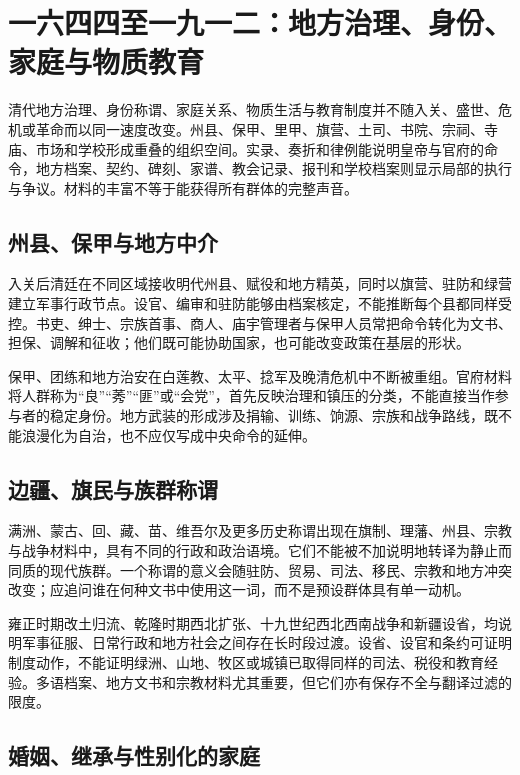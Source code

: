 \section{一六四四至一九一二：地方治理、身份、家庭与物质教育}
\label{sec:qing-local-government-identity-family-material-life}

清代地方治理、身份称谓、家庭关系、物质生活与教育制度并不随入关、盛世、危机或革命而以同一速度改变。州县、保甲、里甲、旗营、土司、书院、宗祠、寺庙、市场和学校形成重叠的组织空间。实录、奏折和律例能说明皇帝与官府的命令，地方档案、契约、碑刻、家谱、教会记录、报刊和学校档案则显示局部的执行与争议。材料的丰富不等于能获得所有群体的完整声音。

\subsection{州县、保甲与地方中介}

入关后清廷在不同区域接收明代州县、赋役和地方精英，同时以旗营、驻防和绿营建立军事行政节点。设官、编审和驻防能够由档案核定，不能推断每个县都同样受控。书吏、绅士、宗族首事、商人、庙宇管理者与保甲人员常把命令转化为文书、担保、调解和征收；他们既可能协助国家，也可能改变政策在基层的形状。

保甲、团练和地方治安在白莲教、太平、捻军及晚清危机中不断被重组。官府材料将人群称为“良”“莠”“匪”或“会党”，首先反映治理和镇压的分类，不能直接当作参与者的稳定身份。地方武装的形成涉及捐输、训练、饷源、宗族和战争路线，既不能浪漫化为自治，也不应仅写成中央命令的延伸。

\subsection{边疆、旗民与族群称谓}

满洲、蒙古、回、藏、苗、维吾尔及更多历史称谓出现在旗制、理藩、州县、宗教与战争材料中，具有不同的行政和政治语境。它们不能被不加说明地转译为静止而同质的现代族群。一个称谓的意义会随驻防、贸易、司法、移民、宗教和地方冲突改变；应追问谁在何种文书中使用这一词，而不是预设群体具有单一动机。

雍正时期改土归流、乾隆时期西北扩张、十九世纪西北西南战争和新疆设省，均说明军事征服、日常行政和地方社会之间存在长时段过渡。设省、设官和条约可证明制度动作，不能证明绿洲、山地、牧区或城镇已取得同样的司法、税役和教育经验。多语档案、地方文书和宗教材料尤其重要，但它们亦有保存不全与翻译过滤的限度。

\subsection{婚姻、继承与性别化的家庭}

